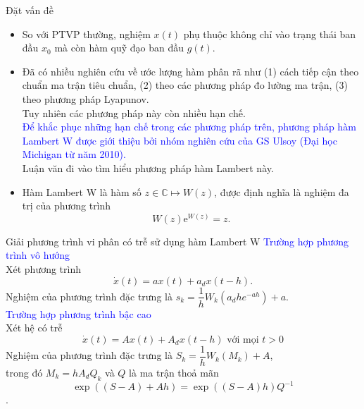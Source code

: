 \documentclass[10pt]{beamer}
\begin{document}
	\begin{frame}{Đặt vấn đề}
		\begin{itemize}
			\item
			So với PTVP thường, nghiệm $x(t)$ phụ thuộc không chỉ vào trạng thái ban đầu $x_0$ mà còn hàm quỹ đạo ban đầu  $g(t)$.
			\item
			Đã có nhiều nghiên cứu về ước lượng hàm phân rã như (1) cách tiếp cận theo chuẩn ma trận tiêu chuẩn, (2) theo các phương pháp đo lường ma trận, (3) theo phương pháp Lyapunov.\\ 
			Tuy nhiên các phương pháp này còn nhiều hạn chế.\\
			\textcolor{blue}{Để khắc phục những hạn chế trong các phương pháp trên, phương pháp hàm Lambert W được giới thiệu bởi nhóm nghiên cứu của GS Ulsoy (Đại học Michigan từ năm 2010).}\\
			Luận văn đi vào tìm hiểu phương pháp hàm Lambert này.\\
			\item Hàm Lambert W là hàm số $z \in \mathbb{C} \mapsto W(z)$, được định nghĩa là nghiệm đa trị của phương trình
			\begin{equation*}\label{eq2}
				W(z) \mathrm{e}^{W(z) }=z.
			\end{equation*} 
		\end{itemize} 
	\end{frame}
	
	\begin{frame}{Giải phương trình vi phân có trễ sử dụng hàm Lambert W }
		\textcolor{blue}{Trường hợp phương trình vô hướng} \\
		Xét phương trình
		\begin{equation*}\label{eq6}
			\dot{x}(t)=ax(t) + a_dx(t -h).
		\end{equation*}
		Nghiệm của phương trình đặc trưng là
		$s_k = \dfrac{1}{h}W_k(a_d h e^{-ah})+a.$
		\\
		\textcolor{blue}{Trường hợp phương trình bậc cao }\\
		Xét hệ có trễ
		\begin{equation*}
			\dot{x}(t) = Ax(t) + A_dx(t-h) \mbox{ với mọi } t>0
		\end{equation*}
		Nghiệm của phương trình đặc trưng là $S_k= \dfrac{1}{h }W_k(M_k)+A$, \\
		trong đó  $M_k=hA_dQ_k$ và $Q$ là ma trận thoả mãn $$\exp \left((S-A) + Ah \right) = \exp \left( (S-A) h \right)Q^{-1}$$.	
	\end{frame}
	
\end{document}
